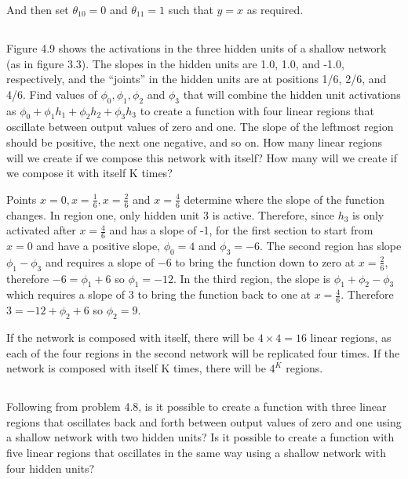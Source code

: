 \documentclass[12pt]{report}
\begin{document}
And then set $\theta_{10} = 0$ and $\theta_{11} = 1$ such that $y=x$ as required.

\subsection{}
\begin{mdframed}
    Figure 4.9 shows the activations in the three hidden units of a shallow network (as in figure 3.3). The slopes in the hidden units are 1.0, 1.0, and -1.0, respectively, and the “joints” in the hidden units are at positions 1/6, 2/6, and 4/6. Find values of $\phi_{0}, \phi_{1}, \phi_{2}$ and $\phi_{3}$ that will combine the hidden unit activations as $\phi_{0} + \phi_{1}h_{1} + \phi_{2}h_{2} + \phi_{3}h_{3}$ to create a function with four linear regions that oscillate between output values of zero and one. The slope of the leftmost region should be positive, the next one negative, and so on. How many linear regions will we create if we compose this network with itself? How many will we create if we compose it with itself K times?
\end{mdframed}

Points $x = 0, x = \frac{1}{6}, x = \frac{2}{6}$ and $x = \frac{4}{6}$ determine where the slope of the function changes. In region one, only hidden unit 3 is active. Therefore, since $h_{3}$ is only activated after $x = \frac{4}{6}$ and has a slope of -1, for the first section to start from $x=0$ and have a positive slope, $\phi_{0} = 4$ and $\phi_{3} = -6$. The second region has slope $\phi_{1} - \phi_{3}$ and requires a slope of $-6$ to bring the function down to zero at $x = \frac{2}{6}$, therefore $-6 = \phi_{1} + 6$ so $\phi_{1} = -12$. In the third region, the slope is $\phi_{1} +\phi_{2} - \phi_{3}$ which requires a slope of 3 to bring the function back to one at $x = \frac{4}{6}$. Therefore $3 = -12 + \phi_{2} + 6$ so $\phi_{2} = 9$.

If the network is composed with itself, there will be $4 \times 4 = 16$ linear regions, as each of the four regions in the second network will be replicated four times. If the network is composed with itself K times, there will be $4^{K}$ regions.

\subsection{}
\begin{mdframed}
    Following from problem 4.8,  is it possible to create a function with three linear regions that oscillates back and forth between output values of zero and one using a shallow network with two hidden units? Is it possible to create a function with five linear regions that oscillates in the same way using a shallow network with four hidden units?
\end{mdframed}
\end{document}
